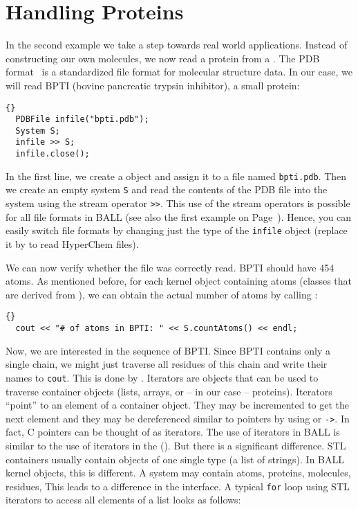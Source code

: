\section{Handling Proteins}

In the second example we take a step towards real world applications. Instead
of constructing our own molecules, we now read a protein from a . The PDB format~\cite{PDB} is a standardized file format for molecular 
structure data. In our case, we will read BPTI (bovine pancreatic trypsin 
inhibitor), a small protein:

\begin{lstlisting}{}
  PDBFile infile("bpti.pdb");
  System S;
  infile >> S;
  infile.close();
\end{lstlisting}

\noindent
In the first line, we create a  object and assign it to a file
named {\tt bpti.pdb}. Then we create an empty system {\tt S} and read the
contents of the PDB file into the system using the stream operator {\tt >>}.
 This use of the stream operators is possible for all
file formats in BALL (see also the first example on 
Page~\pageref{useofstreams}). Hence, you can easily switch file formats by 
changing just the type of the {\tt infile} object (\eg replace it by 
 to read HyperChem files).

We can now verify whether the file was correctly read. BPTI should have 454
atoms. As mentioned before, for each kernel object containing atoms
(\ie classes that are derived from ), we can obtain the
actual number of atoms by calling :

\begin{lstlisting}{}
  cout << "# of atoms in BPTI: " << S.countAtoms() << endl;
\end{lstlisting}

\noindent
Now, we are interested in the sequence of BPTI. Since BPTI contains only a
single chain, we might just traverse all residues of this chain and write
their names to {\tt cout}. This is done by . Iterators are
objects that can be used to traverse container objects (\eg lists, arrays, or
-- in our case -- proteins). Iterators ``point'' to an element of a container
object. They may be incremented to get the next element and they may be
dereferenced similar to pointers by using {\tt *} or {\tt ->}. In fact,
C pointers can be thought of as iterators.
The use of iterators in BALL is similar to the
use of iterators in the  ().
But there is a significant difference. STL containers usually contain objects of
one single type (\eg a list of strings). In BALL kernel objects, this is
different. A system may contain atoms, proteins, molecules, residues, \etc
This leads to a difference in the interface. A typical {\tt for} loop using STL
iterators to access all elements of a list looks as follows:

